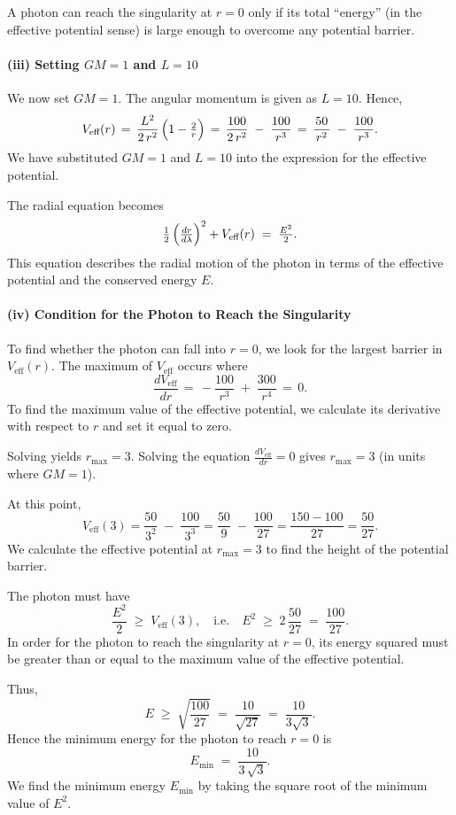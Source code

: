 A photon can reach the singularity at \(r=0\) only if its total ``energy'' (in the effective potential sense) is large enough to overcome any potential barrier.

\paragraph{(iii) Setting \(GM=1\) and \(L=10\)}
We now set \(GM=1\). The angular momentum is given as \(L=10\).
Hence,
\[
V_{\text{eff}}(r)
\,=\,
\frac{L^2}{2\,r^2}\,\Bigl(1-\tfrac{2}{r}\Bigr)
\,=\,
\frac{100}{2\,r^2}
\;-\;
\frac{100}{\,r^3\,}
\,=\,
\frac{50}{\,r^2\,}
\;-\;
\frac{100}{\,r^3\,}.
\]
We have substituted \(GM=1\) and \(L=10\) into the expression for the effective potential.

The radial equation becomes
\[
\tfrac12\,\Bigl(\tfrac{dr}{d\lambda}\Bigr)^2 + V_{\text{eff}}(r)
\;=\;
\tfrac{E^2}{2}.
\]
This equation describes the radial motion of the photon in terms of the effective potential and the conserved energy \(E\).

\paragraph{(iv) Condition for the Photon to Reach the Singularity}
To find whether the photon can fall into \(r=0\), we look for the largest barrier in \(V_{\text{eff}}(r)\). The maximum of \(V_{\text{eff}}\) occurs where
\[
\frac{dV_{\text{eff}}}{dr}
\,=\,
-\frac{100}{r^3}
\;+\;
\frac{300}{r^4}
\,=\,0.
\]
To find the maximum value of the effective potential, we calculate its derivative with respect to \(r\) and set it equal to zero.

Solving yields \(r_{\max} = 3\). Solving the equation \(\frac{dV_{\text{eff}}}{dr} = 0\) gives \(r_{\max} = 3\) (in units where \(GM=1\)).

At this point,
\[
V_{\text{eff}}(3)
=
\frac{50}{3^2}
\;-\;
\frac{100}{3^3}
=
\frac{50}{9}
\;-\;
\frac{100}{27}
=
\frac{150 - 100}{27}
=
\frac{50}{27}.
\]
We calculate the effective potential at \(r_{\max} = 3\) to find the height of the potential barrier.

The photon must have
\[
\frac{E^2}{2}
\;\ge\;
V_{\text{eff}}(3),
\quad\text{i.e.}\quad
E^2
\;\ge\;
2\,\frac{50}{27}
\;=\;
\frac{100}{27}.
\]
In order for the photon to reach the singularity at \(r=0\), its energy squared must be greater than or equal to the maximum value of the effective potential.

Thus,
\[
E
\;\ge\;
\sqrt{\frac{100}{27}}
\;=\;
\frac{10}{\sqrt{27}}
\;=\;
\frac{10}{3\sqrt{3}}.
\]
Hence the minimum energy for the photon to reach \(r=0\) is
\[
E_{\min}
\;=\;
\frac{10}{3\,\sqrt{3}}.
\]
We find the minimum energy \(E_{\min}\) by taking the square root of the minimum value of \(E^2\).

